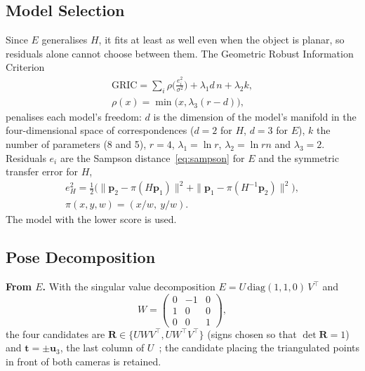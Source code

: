 \documentclass[10pt,a4paper,twocolumn]{article}
\newcommand{\R}{\mathbf{R}}
\newcommand{\tv}{\mathbf{t}}
\begin{document}
\subsection*{Model Selection}
Since $E$ generalises $H$, it fits at least as well even when the object is planar, so residuals alone cannot choose between them. The Geometric Robust Information Criterion~\cite{torr}
\begin{gather}
  \mathrm{GRIC} = \sum_i \rho\!\Big(\frac{e_i^2}{\sigma^2}\Big) + \lambda_1 d\,n + \lambda_2 k,\\
  \rho(x)=\min\!\big(x,\lambda_3(r-d)\big),
\end{gather}
penalises each model's freedom: $d$ is the dimension of the model's manifold in the four-dimensional space of correspondences ($d=2$ for $H$, $d=3$ for $E$), $k$ the number of parameters (8 and 5), $r=4$, $\lambda_1=\ln r$, $\lambda_2=\ln rn$ and $\lambda_3=2$. Residuals $e_i$ are the Sampson distance~\eqref{eq:sampson} for $E$ and the symmetric transfer error for $H$,
\begin{gather}
  e_H^2=\tfrac12\Big(\|\mathbf{p}_2-\pi(H\mathbf{p}_1)\|^2+\|\mathbf{p}_1-\pi(H^{-1}\mathbf{p}_2)\|^2\Big),\label{eq:transfer}\\
  \pi(x,y,w)=(x/w,\ y/w).\nonumber
\end{gather} The model with the lower score is used.

\subsection*{Pose Decomposition}
\textbf{From $E$.} With the singular value decomposition $E=U\,\mathrm{diag}(1,1,0)\,V^\top$ and
\begin{equation}
  W=\begin{pmatrix}0&-1&0\\1&0&0\\0&0&1\end{pmatrix},
\end{equation}
the four candidates are $\R\in\{UWV^\top, UW^\top V^\top\}$ (signs chosen so that $\det\R=1$) and $\tv=\pm\mathbf{u}_3$, the last column of $U$~\cite{hz}; the candidate placing the triangulated points in front of both cameras is retained.
\end{document}
